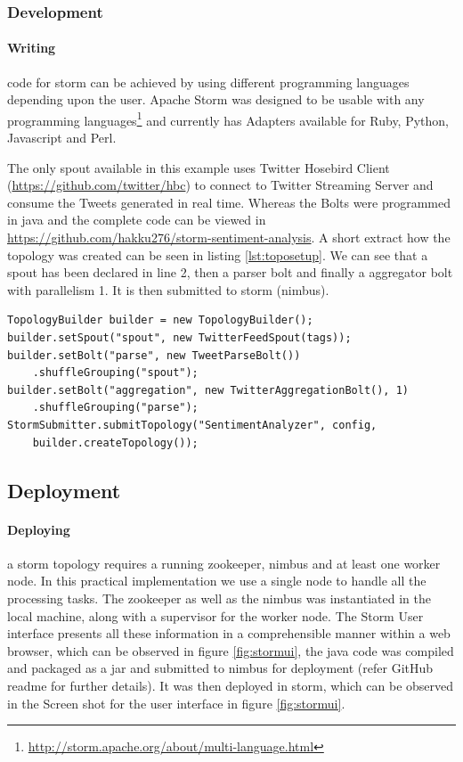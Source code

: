 \documentclass[runningheads,a4paper]{llncs}[2015/06/24]
\begin{document}
\subsubsection{Development}
\paragraph{Writing} code for storm can be achieved by using different programming languages depending upon the user. Apache Storm was designed to be usable with any programming languages\footnote{\url{http://storm.apache.org/about/multi-language.html}} and currently has Adapters available for Ruby, Python, Javascript and Perl.

The only spout available in this example uses Twitter Hosebird Client (\url{https://github.com/twitter/hbc}) to connect to Twitter Streaming Server and consume the Tweets generated in real time. Whereas the Bolts were programmed in java and the complete code can be viewed in \url{https://github.com/hakku276/storm-sentiment-analysis}. A short extract how the topology was created can be seen in listing  \ref{lst:toposetup}. We can see that a spout has been declared in line 2, then a parser bolt and finally a aggregator bolt with parallelism 1. It is then submitted to storm (nimbus).

\begin{lstlisting}[float,caption=Bare Spout Implementation,label=lst:toposetup]
TopologyBuilder builder = new TopologyBuilder();
builder.setSpout("spout", new TwitterFeedSpout(tags));
builder.setBolt("parse", new TweetParseBolt())
	.shuffleGrouping("spout");
builder.setBolt("aggregation", new TwitterAggregationBolt(), 1)
	.shuffleGrouping("parse");
StormSubmitter.submitTopology("SentimentAnalyzer", config, 
	builder.createTopology());
\end{lstlisting}

\subsection{Deployment}
\paragraph{Deploying} a storm topology requires a running zookeeper, nimbus and at least one worker node. In this practical implementation we use a single node to handle all the processing tasks. The zookeeper as well as the nimbus was instantiated in the local machine, along with a supervisor for the worker node. The Storm User interface presents all these information in a comprehensible manner within a web browser, which can be observed in figure \ref{fig:stormui}, the java code was compiled and packaged as a jar and submitted to nimbus for deployment (refer GitHub readme for further details). It was then deployed in storm, which can be observed in the Screen shot for the user interface in figure \ref{fig:stormui}.
\end{document}
